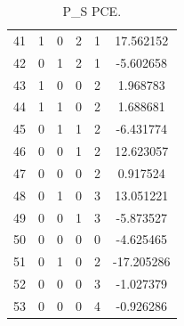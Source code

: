 \documentclass[preprint,12pt]{elsarticle}
\begin{document}
\begin{table}[h!]
\begin{minipage}[h!]{0.23\textwidth}
{\begin{tabular}{|c|ccccc|}
41 &   1 &   0 &   2 &   1 &   17.562152 \\
42 &   0 &   1 &   2 &   1 &   -5.602658 \\
43 &   1 &   0 &   0 &   2 &    1.968783 \\
44 &   1 &   1 &   0 &   2 &    1.688681 \\
45 &   0 &   1 &   1 &   2 &   -6.431774 \\
46 &   0 &   0 &   1 &   2 &   12.623057 \\
47 &   0 &   0 &   0 &   2 &    0.917524 \\
48 &   0 &   1 &   0 &   3 &   13.051221 \\
49 &   0 &   0 &   1 &   3 &   -5.873527 \\
50 &   0 &   0 &   0 &   0 &   -4.625465 \\
51 &   0 &   1 &   0 &   2 &  -17.205286 \\
52 &   0 &   0 &   0 &   3 &   -1.027379 \\
53 &   0 &   0 &   0 &   4 &   -0.926286 \\
\hline
\end{tabular}}
\caption{\tiny P\_S PCE.}
\end{minipage}%
%
\begin{minipage}[h!]{0.23\textwidth}
\end{minipage}
\end{table}
\end{document}
